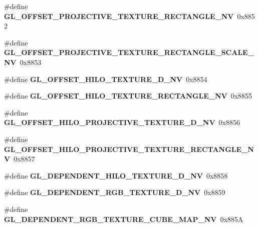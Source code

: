 \begin{DoxyCompactItemize}
\item 
\#define {\bfseries G\+L\+\_\+\+O\+F\+F\+S\+E\+T\+\_\+\+P\+R\+O\+J\+E\+C\+T\+I\+V\+E\+\_\+\+T\+E\+X\+T\+U\+R\+E\+\_\+\+R\+E\+C\+T\+A\+N\+G\+L\+E\+\_\+\+N\+V}~0x8852\label{_s_d_l__opengl_8h_a6a3b8298af2ac6f439b7b8ba8db89901}

\item 
\#define {\bfseries G\+L\+\_\+\+O\+F\+F\+S\+E\+T\+\_\+\+P\+R\+O\+J\+E\+C\+T\+I\+V\+E\+\_\+\+T\+E\+X\+T\+U\+R\+E\+\_\+\+R\+E\+C\+T\+A\+N\+G\+L\+E\+\_\+\+S\+C\+A\+L\+E\+\_\+\+N\+V}~0x8853\label{_s_d_l__opengl_8h_ab1e5db326097d1a32bc7d68bfaab6dab}

\item 
\#define {\bfseries G\+L\+\_\+\+O\+F\+F\+S\+E\+T\+\_\+\+H\+I\+L\+O\+\_\+\+T\+E\+X\+T\+U\+R\+E\+\_\+D\+\_\+\+N\+V}~0x8854\label{_s_d_l__opengl_8h_ade03a04a71e28b97e6e420e59eb4da9e}

\item 
\#define {\bfseries G\+L\+\_\+\+O\+F\+F\+S\+E\+T\+\_\+\+H\+I\+L\+O\+\_\+\+T\+E\+X\+T\+U\+R\+E\+\_\+\+R\+E\+C\+T\+A\+N\+G\+L\+E\+\_\+\+N\+V}~0x8855\label{_s_d_l__opengl_8h_abbc3efb4a2fcd2b735b579dc656ba6cb}

\item 
\#define {\bfseries G\+L\+\_\+\+O\+F\+F\+S\+E\+T\+\_\+\+H\+I\+L\+O\+\_\+\+P\+R\+O\+J\+E\+C\+T\+I\+V\+E\+\_\+\+T\+E\+X\+T\+U\+R\+E\+\_\+D\+\_\+\+N\+V}~0x8856\label{_s_d_l__opengl_8h_a13cde4e810b26c0d8cb6caf56ea33703}

\item 
\#define {\bfseries G\+L\+\_\+\+O\+F\+F\+S\+E\+T\+\_\+\+H\+I\+L\+O\+\_\+\+P\+R\+O\+J\+E\+C\+T\+I\+V\+E\+\_\+\+T\+E\+X\+T\+U\+R\+E\+\_\+\+R\+E\+C\+T\+A\+N\+G\+L\+E\+\_\+\+N\+V}~0x8857\label{_s_d_l__opengl_8h_ac6168ab85ff8ca2b666750781a2b4584}

\item 
\#define {\bfseries G\+L\+\_\+\+D\+E\+P\+E\+N\+D\+E\+N\+T\+\_\+\+H\+I\+L\+O\+\_\+\+T\+E\+X\+T\+U\+R\+E\+\_\+D\+\_\+\+N\+V}~0x8858\label{_s_d_l__opengl_8h_ac807d06fb2e5e3a201e61c96e548dd96}

\item 
\#define {\bfseries G\+L\+\_\+\+D\+E\+P\+E\+N\+D\+E\+N\+T\+\_\+\+R\+G\+B\+\_\+\+T\+E\+X\+T\+U\+R\+E\+\_\+D\+\_\+\+N\+V}~0x8859\label{_s_d_l__opengl_8h_a6d8e9d9c65f230d02084520861025af2}

\item 
\#define {\bfseries G\+L\+\_\+\+D\+E\+P\+E\+N\+D\+E\+N\+T\+\_\+\+R\+G\+B\+\_\+\+T\+E\+X\+T\+U\+R\+E\+\_\+\+C\+U\+B\+E\+\_\+\+M\+A\+P\+\_\+\+N\+V}~0x885\+A\label{_s_d_l__opengl_8h_ab764558a3e9b953cebbb17fca92cf78e}


\end{DoxyCompactItemize}
